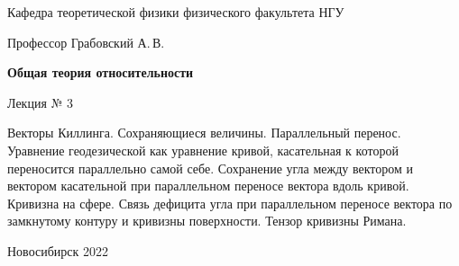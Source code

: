 \documentclass[12pt,pagesize,paper=192mm:108mm,landscape]{scrbook}
\begin{document}
\begin{titlepage}
\begin{center}
    Кафедра теоретической физики физического факультета НГУ
    \medskip

    \Large
    Профессор Грабовский А.\,В.
    \smallskip

    \huge
    \textbf{Общая теория относительности}
    \smallskip

    \Large
    Лекция № 3
    \vfill

    \normalsize
    \begin{minipage}{0.9\linewidth}
      Векторы Киллинга. Сохраняющиеся величины. Параллельный
      перенос. Уравнение геодезической как уравнение кривой,
      касательная к которой переносится параллельно самой
      себе. Сохранение угла между вектором и вектором касательной при
      параллельном переносе вектора вдоль кривой. Кривизна на
      сфере. Связь дефицита угла при параллельном переносе вектора по
      замкнутому контуру и кривизны поверхности. Тензор кривизны
      Римана.
    \end{minipage}
    \vfill

    \normalsize \ccbysa\hspace{0.5em}  Новосибирск 2022
  \end{center}
\end{titlepage}
\end{document}
